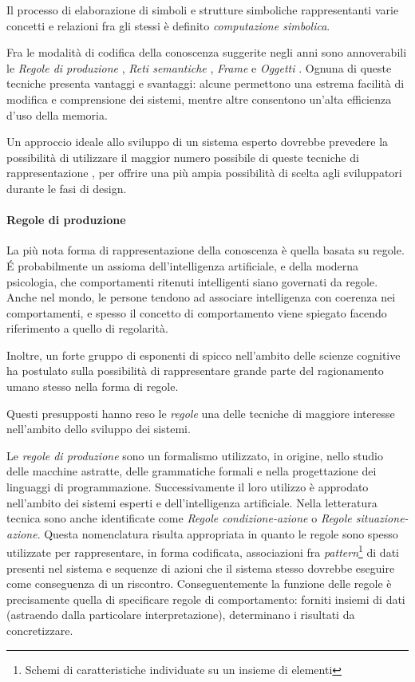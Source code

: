 Il processo di elaborazione di simboli e strutture simboliche rappresentanti varie concetti e relazioni fra gli stessi è definito \emph{computazione simbolica}.

Fra le modalità di codifica della conoscenza suggerite negli anni sono annoverabili le \emph{Regole di produzione} \cite{davisking1975}, \emph{Reti semantiche} \cite{richens1956}, \emph{Frame} \cite{minsky1974} e \emph{Oggetti} \cite{holsapple1994object} \cite{holsapple1994operations}. Ognuna di queste tecniche presenta vantaggi e svantaggi: alcune permettono una estrema facilità di modifica e comprensione dei sistemi, mentre altre consentono un'alta efficienza d'uso della memoria.

Un approccio ideale allo sviluppo di un sistema esperto dovrebbe prevedere la possibilità di utilizzare il maggior numero possibile di queste tecniche di rappresentazione \cite{development1993}, per offrire una più ampia possibilità di scelta agli sviluppatori durante le fasi di design.

\paragraph{Regole di produzione}
La più nota forma di rappresentazione della conoscenza è quella basata su regole. \'E probabilmente un assioma dell'intelligenza artificiale, e della moderna psicologia, che comportamenti ritenuti intelligenti siano governati da regole. Anche nel mondo, le persone tendono ad associare intelligenza con coerenza nei comportamenti, e spesso il concetto di comportamento viene spiegato facendo riferimento a quello di regolarità. \cite{jackson1999}

Inoltre, un forte gruppo di esponenti di spicco nell'ambito delle scienze cognitive ha postulato sulla possibilità di rappresentare grande parte del ragionamento umano stesso nella forma di regole. \cite{anderson1993rules}

Questi presupposti hanno reso le \emph{regole} una delle tecniche di maggiore interesse nell'ambito dello sviluppo dei sistemi.

Le \emph{regole di produzione} sono un formalismo utilizzato, in origine, nello studio delle macchine astratte, delle grammatiche formali e nella progettazione dei linguaggi di programmazione. Successivamente il loro utilizzo è approdato nell'ambito dei sistemi esperti e dell'intelligenza artificiale. Nella letteratura tecnica sono anche identificate come \emph{Regole condizione-azione} o \emph{Regole situazione-azione}. Questa nomenclatura risulta appropriata in quanto le regole sono spesso utilizzate per rappresentare, in forma codificata, associazioni fra \emph{pattern}\footnote{Schemi di caratteristiche individuate su un insieme di elementi} di dati presenti nel sistema e sequenze di azioni che il sistema stesso dovrebbe eseguire come conseguenza di un riscontro. Conseguentemente la funzione delle regole è precisamente quella di specificare regole di comportamento: forniti insiemi di dati (astraendo dalla particolare interpretazione), determinano i risultati da concretizzare.

